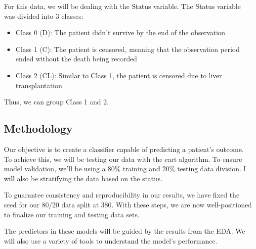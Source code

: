 \documentclass[
]{article}
\newenvironment{Shaded}{\begin{snugshade}}{\end{snugshade}}
\newcommand{\CommentTok}[1]{\textcolor[rgb]{0.56,0.35,0.01}{\textit{#1}}}
\newcommand{\DecValTok}[1]{\textcolor[rgb]{0.00,0.00,0.81}{#1}}
\newcommand{\FunctionTok}[1]{\textcolor[rgb]{0.13,0.29,0.53}{\textbf{#1}}}
\newcommand{\NormalTok}[1]{#1}
\newcommand{\OtherTok}[1]{\textcolor[rgb]{0.56,0.35,0.01}{#1}}
\newcommand{\SpecialCharTok}[1]{\textcolor[rgb]{0.81,0.36,0.00}{\textbf{#1}}}
\newcommand{\StringTok}[1]{\textcolor[rgb]{0.31,0.60,0.02}{#1}}
\providecommand{\tightlist}{%
  \setlength{\itemsep}{0pt}\setlength{\parskip}{0pt}}
\begin{document}
For this data, we will be dealing with the Status variable. The Status
variable was divided into 3 classes:

\begin{itemize}
\tightlist
\item
  Class 0 (D): The patient didn't survive by the end of the observation
\item
  Class 1 (C): The patient is censored, meaning that the observation
  period ended without the death being recorded
\item
  Class 2 (CL): Similar to Class 1, the patient is censored due to liver
  transplantation
\end{itemize}

Thus, we can group Class 1 and 2.

\begin{Shaded}
\end{Shaded}

\hypertarget{methodology}{%
\subsection{Methodology}\label{methodology}}

Our objective is to create a classifier capable of predicting a
patient's outcome. To achieve this, we will be testing our data with the
cart algorithm. To ensure model validation, we'll be using a 80\%
training and 20\% testing data division. I will also be stratifying the
data based on the status.

To guarantee consistency and reproducibility in our results, we have
fixed the seed for our 80/20 data split at 380. With these steps, we are
now well-positioned to finalize our training and testing data sets.

The predictors in these models will be guided by the results from the
EDA. We will also use a variety of tools to understand the model's
performance.
\end{document}

